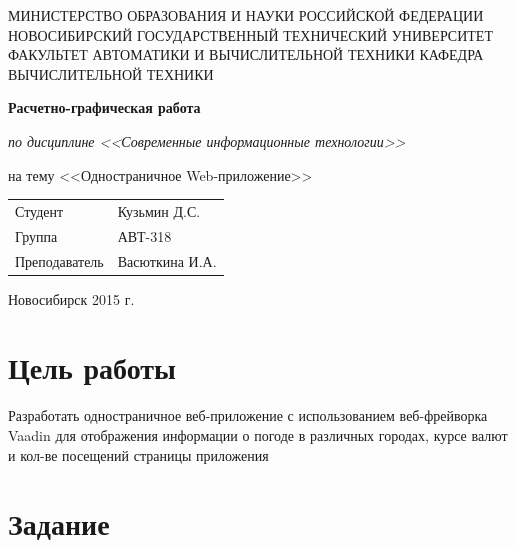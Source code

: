 \documentclass{article}
\begin{document}
\begin{center}

МИНИСТЕРСТВО ОБРАЗОВАНИЯ И НАУКИ РОССИЙСКОЙ ФЕДЕРАЦИИ
НОВОСИБИРСКИЙ ГОСУДАРСТВЕННЫЙ ТЕХНИЧЕСКИЙ УНИВЕРСИТЕТ
ФАКУЛЬТЕТ АВТОМАТИКИ И ВЫЧИСЛИТЕЛЬНОЙ ТЕХНИКИ
КАФЕДРА ВЫЧИСЛИТЕЛЬНОЙ ТЕХНИКИ

\vspace{\fill}
{\bfseries \Large Расчетно-графическая работа}

{\itshape по дисциплине <<Современные информационные технологии>>}

на тему <<Одностраничное Web-приложение>>

\vspace{\fill}

\begin{flushleft}
\begin{tabular}{ l l }
Студент & Кузьмин Д.С. \\
Группа & АВТ-318 \\
Преподаватель & Васюткина И.А. \\
\end{tabular}
\end{flushleft}

\vspace{\fill}
Новосибирск 2015 г.
\end{center}
\pagebreak



\section*{Цель работы}

Разработать одностраничное веб-приложение с использованием веб-фрейворка Vaadin для отображения 
информации о погоде в различных городах, курсе валют и кол-ве посещений страницы приложения


\section*{Задание}
\end{document}
